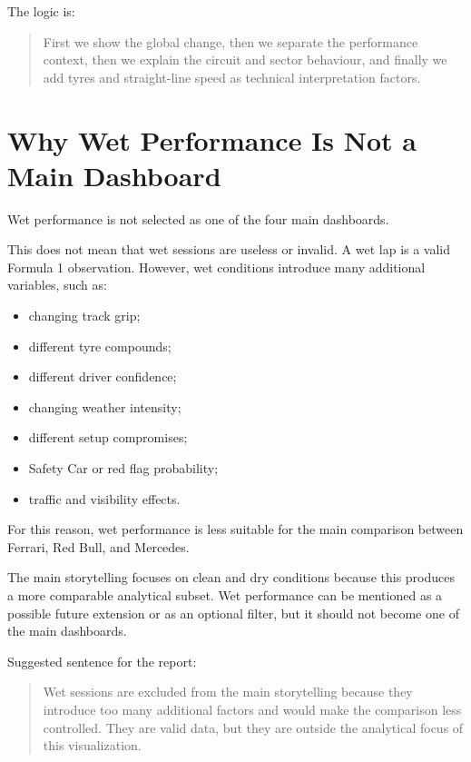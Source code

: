 \documentclass[12pt,a4paper]{article}
\begin{document}
	The logic is:
	
	\begin{quote}
		First we show the global change, then we separate the performance context, then we explain the circuit and sector behaviour, and finally we add tyres and straight-line speed as technical interpretation factors.
	\end{quote}
	
	\section{Why Wet Performance Is Not a Main Dashboard}
	
	Wet performance is not selected as one of the four main dashboards.
	
	This does not mean that wet sessions are useless or invalid.
	A wet lap is a valid Formula 1 observation.
	However, wet conditions introduce many additional variables, such as:
	
	\begin{itemize}[leftmargin=1.2cm]
		\item changing track grip;
		\item different tyre compounds;
		\item different driver confidence;
		\item changing weather intensity;
		\item different setup compromises;
		\item Safety Car or red flag probability;
		\item traffic and visibility effects.
	\end{itemize}
	
	For this reason, wet performance is less suitable for the main comparison between Ferrari, Red Bull, and Mercedes.
	
	The main storytelling focuses on clean and dry conditions because this produces a more comparable analytical subset.
	Wet performance can be mentioned as a possible future extension or as an optional filter, but it should not become one of the main dashboards.
	
	Suggested sentence for the report:
	
	\begin{quote}
		Wet sessions are excluded from the main storytelling because they introduce too many additional factors and would make the comparison less controlled. They are valid data, but they are outside the analytical focus of this visualization.
	\end{quote}
	
\end{document}
